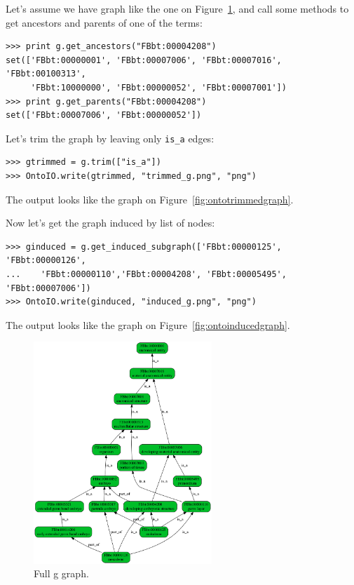 \documentclass{report}
\begin{document}
Let's assume we have graph like the one on Figure~\ref{fig:ontofullgraph}, and
call some methods to get ancestors and parents of one of the terms:

\begin{verbatim}
>>> print g.get_ancestors("FBbt:00004208")
set(['FBbt:00000001', 'FBbt:00007006', 'FBbt:00007016', 'FBbt:00100313',
     'FBbt:10000000', 'FBbt:00000052', 'FBbt:00007001'])
>>> print g.get_parents("FBbt:00004208")
set(['FBbt:00007006', 'FBbt:00000052'])
\end{verbatim}

Let's trim the graph by leaving only \verb|is_a| edges:
\begin{verbatim}
>>> gtrimmed = g.trim(["is_a"])
>>> OntoIO.write(gtrimmed, "trimmed_g.png", "png")
\end{verbatim}

The output looks like the graph on Figure~\ref{fig:ontotrimmedgraph}.

Now let's get the graph induced by list of nodes:
\begin{verbatim}
>>> ginduced = g.get_induced_subgraph(['FBbt:00000125', 'FBbt:00000126',
...    'FBbt:00000110','FBbt:00004208', 'FBbt:00005495', 'FBbt:00007006'])
>>> OntoIO.write(ginduced, "induced_g.png", "png")
\end{verbatim}

The output looks like the graph on Figure~\ref{fig:ontoinducedgraph}.


\begin{htmlonly}
\label{fig:ontofullgraph}
\end{htmlonly}

\begin{latexonly}
\begin{figure}[htbp]
\centering
\includegraphics[width=0.6\textwidth]{images/full_g.png}
\caption{Full g graph.}
\label{fig:ontofullgraph}
\end{figure}
\end{latexonly}
\end{document}

